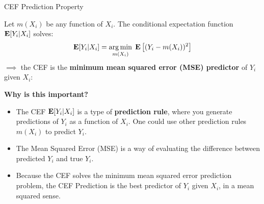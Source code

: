 \documentclass[compress, 8pt]{beamer}
\begin{document}
\begin{frame}{CEF Prediction Property}

Let $m(X_i)$ be any function of $X_i$. The conditional expectation function $\mathbf{E} [Y_i \vert X_i]$ solves:
\begin{equation*}
    \mathbf{E} [Y_i \vert X_i] = \operatorname*{arg\,min}_{m(X_i)} \; \mathbf{E} \left[ (Y_i - m(X_i))^2 \right]
\end{equation*}
$\implies$ the CEF is the \textbf{minimum mean squared error (MSE) predictor} of $Y_i$ given $X_i$:

\vspace{2ex}
\textbf{Why is this important?}
\begin{itemize}
    \item The CEF $\mathbf{E} [Y_i \vert X_i]$ is a type of \textbf{prediction rule}, where you generate predictions of $Y_i$ as a function of $X_i$. One could use other prediction rules $m(X_i)$ to predict $Y_i$.
    \item The Mean Squared Error (MSE) is a way of evaluating the difference between predicted $Y_i$ and true $Y_i$. 
    \item Because the CEF solves the minimum mean squared error prediction problem, the CEF Prediction is the best predictor of $Y_i$ given $X_i$, in a mean squared sense. 
\end{itemize}

\end{frame}
\end{document}
